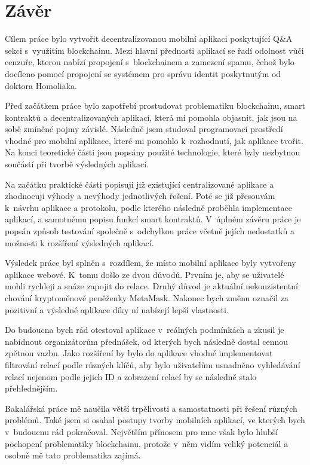 \chapter{Závěr}
Cílem práce bylo vytvořit decentralizovanou mobilní aplikaci poskytující Q\&A sekci s~využitím blockchainu. Mezi hlavní přednosti aplikací se řadí odolnost vůči cenzuře, kterou nabízí propojení s~blockchainem a zamezení spamu, čehož bylo docíleno pomocí propojení se systémem pro správu identit poskytnutým od doktora Homoliaka.


Před začátkem práce bylo zapotřebí prostudovat problematiku blockchainu, smart kontraktů a decentralizovaných aplikací, která mi pomohla objasnit, jak jsou na sobě zmíněné pojmy závislé. Následně jsem studoval programovací prostředí vhodné pro mobilní aplikace, které mi pomohlo k~rozhodnutí, jak aplikace tvořit. Na konci teoretické části jsou popsány použité technologie, které byly nezbytnou součástí při tvorbě výsledných aplikací.

Na začátku praktické části popisuji již existující centralizované aplikace a zhodnocuji výhody a nevýhody jednotlivých řešení. Poté se již přesouvám k~návrhu aplikace a protokolu, podle kterého následně proběhla implementace aplikací, a samotnému popisu funkcí smart kontraktů. V~úplném závěru práce je popsán způsob testování společně s~odchylkou práce včetně jejích nedostatků a možnosti k rozšíření výsledných aplikací.

Výsledek práce byl splněn s~rozdílem, že místo mobilní aplikace byly vytvořeny aplikace webové. K~tomu došlo ze dvou důvodů. Prvním je, aby se uživatelé mohli rychleji a snáze zapojit do relace. Druhý důvod je aktuální nekonzistentní chování kryptoměnové peněženky MetaMask. Nakonec bych změnu označil za pozitivní a výsledné aplikace díky ní nabízejí lepší vlastnosti. 

Do budoucna bych rád otestoval aplikace v~reálných podmínkách a zkusil je nabídnout organizátorům přednášek, od kterých bych následně dostal cennou zpětnou vazbu. Jako rozšíření by bylo do aplikace vhodné implementovat filtrování relací podle různých klíčů, aby bylo uživatelům usnadněno vyhledávání relací nejenom podle jejich ID a zobrazení relací by se následně stalo přehlednějším. 

Bakalářská práce mě naučila větší trpělivosti a samostatnosti při řešení různých problémů. Také jsem si osahal postupy tvorby mobilních aplikací, ve kterých bych v~budoucnu rád pokračoval. Největším přínosem pro mne však bylo hlubší pochopení problematiky blockchainu, protože v~něm vidím veliký potenciál a osobně mě tato problematika zajímá.